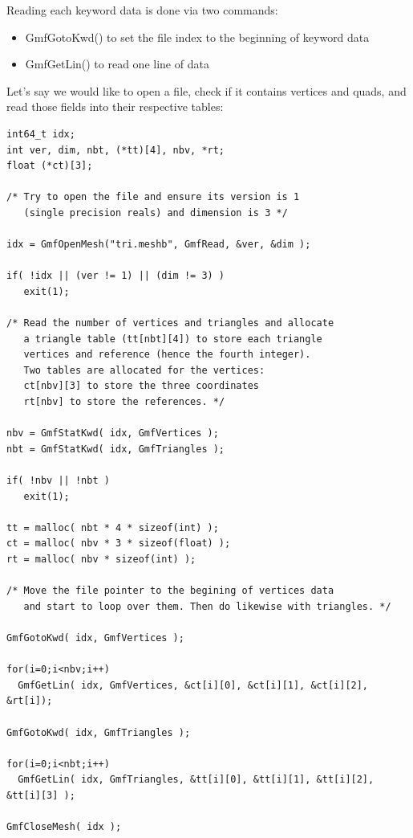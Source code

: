 \documentclass[a4paper,12pt]{article}
\begin{document}
Reading each keyword data is done via two commands:

\begin{itemize}
\item GmfGotoKwd() to set the file index to the beginning of keyword data
\item GmfGetLin() to read one line of data
\end{itemize}

Let's say we would like to open a file, check if it contains vertices and quads, and read those fields into their respective tables:

\begin{tt}
\begin{verbatim}
int64_t idx;
int ver, dim, nbt, (*tt)[4], nbv, *rt;
float (*ct)[3];

/* Try to open the file and ensure its version is 1
   (single precision reals) and dimension is 3 */

idx = GmfOpenMesh("tri.meshb", GmfRead, &ver, &dim );

if( !idx || (ver != 1) || (dim != 3) )
   exit(1);

/* Read the number of vertices and triangles and allocate
   a triangle table (tt[nbt][4]) to store each triangle
   vertices and reference (hence the fourth integer).
   Two tables are allocated for the vertices:
   ct[nbv][3] to store the three coordinates
   rt[nbv] to store the references. */

nbv = GmfStatKwd( idx, GmfVertices );
nbt = GmfStatKwd( idx, GmfTriangles );

if( !nbv || !nbt )
   exit(1);

tt = malloc( nbt * 4 * sizeof(int) );
ct = malloc( nbv * 3 * sizeof(float) );
rt = malloc( nbv * sizeof(int) );

/* Move the file pointer to the begining of vertices data
   and start to loop over them. Then do likewise with triangles. */

GmfGotoKwd( idx, GmfVertices );

for(i=0;i<nbv;i++)
  GmfGetLin( idx, GmfVertices, &ct[i][0], &ct[i][1], &ct[i][2], &rt[i]);

GmfGotoKwd( idx, GmfTriangles );

for(i=0;i<nbt;i++)
  GmfGetLin( idx, GmfTriangles, &tt[i][0], &tt[i][1], &tt[i][2], &tt[i][3] );

GmfCloseMesh( idx );
\end{verbatim}
\end{tt}
\normalfont
\end{document}
